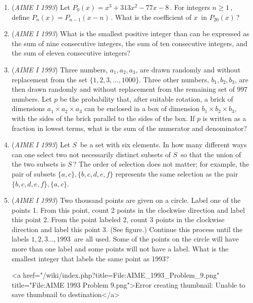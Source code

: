 \begin{enumerate}
 

	\item (\textit{AIME I 1993}) Let $P_0(x) = x^3 + 313x^2 - 77x - 8\,$.  For integers $n \ge 1\,$, define $P_n(x) = P_{n - 1}(x - n)\,$.  What is the coefficient of $x\,$ in $P_{20}(x)\,$?


 

	\item (\textit{AIME I 1993}) What is the smallest positive integer than can be expressed as the sum of nine consecutive integers, the sum of ten consecutive integers, and the sum of eleven consecutive integers?


 

	\item (\textit{AIME I 1993}) Three numbers, $a_1, a_2, a_3$, are drawn randomly and without replacement from the set $\{1, 2, 3,\ldots, 1000\}$. Three other numbers, $b_1, b_2, b_3$, are then drawn randomly and without replacement from the remaining set of $997$ numbers. Let $p$ be the probability that, after suitable rotation, a brick of dimensions $a_1 \times a_2 \times a_3$ can be enclosed in a box of dimension $b_1 \times b_2 \times b_3$, with the sides of the brick parallel to the sides of the box. If $p$ is written as a fraction in lowest terms, what is the sum of the numerator and denominator?


 

	\item (\textit{AIME I 1993}) Let $S\,$ be a set with six elements. In how many different ways can one select two not necessarily distinct subsets of $S\,$ so that the union of the two subsets is $S\,$?  The order of selection does not matter; for example, the pair of subsets $\{a, c\},\{b, c, d, e, f\}$ represents the same selection as the pair $\{b, c, d, e, f\},\{a, c\}.$


	\item (\textit{AIME I 1993}) Two thousand points are given on a circle. Label one of the points 1. From this point, count 2 points in the clockwise direction and label this point 2. From the point labeled 2, count 3 points in the clockwise direction and label this point 3. (See figure.) Continue this process until the labels $1,2,3\dots,1993\,$ are all used. Some of the points on the circle will have more than one label and some points will not have a label. What is the smallest integer that labels the same point as 1993? 


 <a href="/wiki/index.php?title=File:AIME\_1993\_Problem\_9.png" title="File:AIME 1993 Problem 9.png">Error creating thumbnail: Unable to save thumbnail to destination</a>



\end{enumerate}
